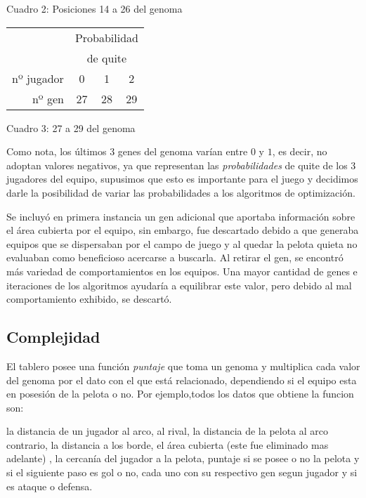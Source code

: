 \vskip 1mm
\begin{center}
{Cuadro 2: Posiciones 14 a 26 del genoma}
\end{center}

\begin{tabular}{r|ccc|}
\cline{2-4}
 & \multicolumn{3}{c|}{Probabilidad} \\
 & \multicolumn{3}{c|}{de quite} \\ \hline
\multicolumn{1}{|r|}{nº jugador} & 0 & 1 & 2 \\ \hline
\multicolumn{1}{|r|}{nº gen} & 27 & 28 & 29 \\ \hline
\end{tabular}

\vskip 1mm
\begin{center}
{Cuadro 3: 27 a 29 del genoma}
\end{center}

Como nota, los últimos 3 genes del genoma varían entre $0$ y $1$, es decir, no
adoptan valores negativos, ya que representan las {\it probabilidades\/} de
quite de los 3 jugadores del equipo, supusimos que esto es importante para el
juego y decidimos darle la posibilidad de variar las probabilidades a los
algoritmos de optimización.

Se incluyó en primera instancia un gen adicional que aportaba información sobre
el área cubierta por el equipo, sin embargo,  fue descartado debido a que
generaba equipos que se dispersaban por el campo de juego y al quedar la pelota
quieta no evaluaban como beneficioso acercarse a buscarla. Al retirar el gen,
se encontró más variedad de comportamientos en los equipos. Una mayor cantidad de
genes e iteraciones de los algoritmos ayudaría a equilibrar este valor, pero
debido al mal comportamiento exhibido, se descartó.

\subsection{Complejidad}

El tablero posee una función {\it puntaje\/} que toma un genoma y
multiplica cada valor del genoma por el dato con el que está relacionado,
dependiendo si el equipo esta en posesión de la pelota o no. Por ejemplo,todos
los datos que obtiene la funcion son:


la distancia de un jugador al arco, al rival, la distancia de la
pelota al arco contrario, la distancia a los borde, el área cubierta (este fue eliminado mas adelante)
, la cercanía del jugador a la pelota, puntaje si se posee o no la pelota y si el
siguiente paso es gol o no, cada uno con su respectivo gen segun jugador y si es ataque o defensa.

